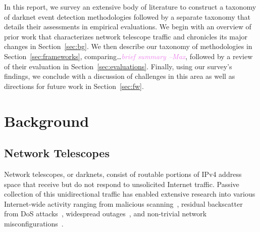 \documentclass[manuscript,nonacm]{acmart}
\newcommand{\maxnote}[1]{\textit{\textcolor{violet}{#1 --Max}}}
\begin{document}


In this report, we survey an extensive body of literature to construct a taxonomy of darknet event detection methodologies followed by a separate taxonomy that details their assessments in empirical evaluations. 
We begin with an overview of prior work that characterizes network telescope traffic and chronicles its major changes in Section~\ref{sec:bg}.
We then describe our taxonomy of methodologies in Section~\ref{sec:frameworks}, comparing\dots\maxnote{brief summary}, followed by a review of their evaluation in Section~\ref{sec:evaluations}.
Finally, using our survey's findings, we conclude with a discussion of challenges in this area as well as directions for future work in Section~\ref{sec:fw}.


\label{sec:bg}
\section{Background}

\subsection{Network Telescopes}

Network telescopes, or darknets, consist of routable portions of IPv4 address space that receive but do not respond to unsolicited Internet traffic. 
Passive collection of this unidirectional traffic has enabled extensive research into various Internet-wide activity ranging from 
malicious scanning~\cite{@@}, residual backscatter from DoS attacks~\cite{@@}, widespread outages~\cite{@@}, and non-trivial network misconfigurations~\cite{@@}.
\end{document}
